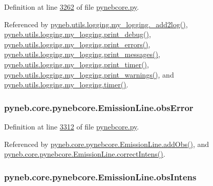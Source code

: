 Definition at line \hyperlink{pynebcore_8py_source_l03262}{3262} of file \hyperlink{pynebcore_8py_source}{pynebcore.\+py}.



Referenced by \hyperlink{logging_8py_source_l00059}{pyneb.\+utils.\+logging.\+my\+\_\+logging.\+\_\+add2log()}, \hyperlink{logging_8py_source_l00157}{pyneb.\+utils.\+logging.\+my\+\_\+logging.\+print\+\_\+debug()}, \hyperlink{logging_8py_source_l00149}{pyneb.\+utils.\+logging.\+my\+\_\+logging.\+print\+\_\+errors()}, \hyperlink{logging_8py_source_l00133}{pyneb.\+utils.\+logging.\+my\+\_\+logging.\+print\+\_\+messages()}, \hyperlink{logging_8py_source_l00165}{pyneb.\+utils.\+logging.\+my\+\_\+logging.\+print\+\_\+timer()}, \hyperlink{logging_8py_source_l00141}{pyneb.\+utils.\+logging.\+my\+\_\+logging.\+print\+\_\+warnings()}, and \hyperlink{logging_8py_source_l00115}{pyneb.\+utils.\+logging.\+my\+\_\+logging.\+timer()}.

\hypertarget{classpyneb_1_1core_1_1pynebcore_1_1_emission_line_a4434ba9895df707a62bf375cd0e6e9c0}{}
\subsubsection[{obs\+Error}]{\setlength{\rightskip}{0pt plus 5cm}pyneb.\+core.\+pynebcore.\+Emission\+Line.\+obs\+Error}\label{classpyneb_1_1core_1_1pynebcore_1_1_emission_line_a4434ba9895df707a62bf375cd0e6e9c0}


Definition at line \hyperlink{pynebcore_8py_source_l03312}{3312} of file \hyperlink{pynebcore_8py_source}{pynebcore.\+py}.



Referenced by \hyperlink{pynebcore_8py_source_l03347}{pyneb.\+core.\+pynebcore.\+Emission\+Line.\+add\+Obs()}, and \hyperlink{pynebcore_8py_source_l03325}{pyneb.\+core.\+pynebcore.\+Emission\+Line.\+correct\+Intens()}.

\hypertarget{classpyneb_1_1core_1_1pynebcore_1_1_emission_line_a8ac6d9eaaf4eb17606577a858edb1d71}{}
\subsubsection[{obs\+Intens}]{\setlength{\rightskip}{0pt plus 5cm}pyneb.\+core.\+pynebcore.\+Emission\+Line.\+obs\+Intens}\label{classpyneb_1_1core_1_1pynebcore_1_1_emission_line_a8ac6d9eaaf4eb17606577a858edb1d71}


